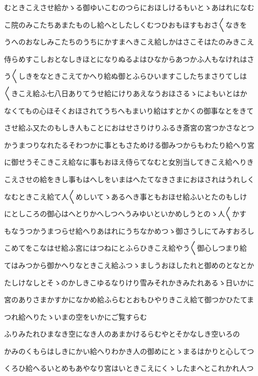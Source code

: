 \documentclass[a4paper,11pt,landscape]{ltjtarticle}
\begin{document}
むときこえさせ給かゝる御ゆいこむのつらにおほしけるもいとゝあはれになむ
\par\medskip
こ院のみこたちあまたものし給へとしたしくむつひおもほすもおさ〱なきを
\par\medskip
うへのおなしみこたちのうちにかすまへきこえ給しかはさこそはたのみきこえ
\par\medskip
侍らめすこしおとなしきほとになりぬるよはひなからあつかふ人もなけれはさ
\par\medskip
う〱しきをなときこえてかへり給ぬ御とふらひいますこしたちまさりてしは
\par\medskip
〱きこえ給ふ七八日ありてうせ給にけりあえなうおほさるゝによもいとはか
\par\medskip
なくてもの心ほそくおほされてうちへもまいり給はすとかくの御事なとをきて
\par\medskip
させ給ふ又たのもしき人もことにおはせさりけりふるき斎宮の宮つかさなとつ
\par\medskip
かうまつりなれたるそわつかに事ともさためける御みつからもわたり給へり宮
\par\medskip
に御せうそこきこえ給なに事もおほえ侍らてなむと女別当してきこえ給へりき
\par\medskip
こえさせの給をきし事もはへしをいまはへたてなきさまにおほされはうれしく
\par\medskip
なむときこえ給て人〱めしいてゝあるへき事ともおほせ給ふいとたのもしけ
\par\medskip
にとしころの御心はへとりかへしつへうみゆいといかめしうとのゝ人〱かす
\par\medskip
もなうつかうまつらせ給へりあはれにうちなかめつゝ御さうしにてみすおろし
\par\medskip
こめてをこなはせ給ふ宮にはつねにとふらひきこえ給やう〱御心しつまり給
\par\medskip
てはみつから御かへりなときこえ給ふつゝましうおほしたれと御めのとなとか
\par\medskip
たしけなしとそゝのかしきこゆるなりけり雪みそれかきみたれあるゝ日いかに
\par\medskip
宮のありさまかすかになかめ給ふらむとおもひやりきこえ給て御つかひたてま
\par\medskip
つれ給へりたゝいまの空をいかにご覧すらむ
\par\medskip
ふりみたれひまなき空になき人のあまかけるらむやとそかなしき空いろの
\par\medskip
かみのくもらはしきにかい給へりわかき人の御めにとゝまるはかりと心してつ
\par\medskip
くろひ給へるいとめもあやなり宮はいときこえにくゝしたまへとこれかれ人つ
\end{document}
